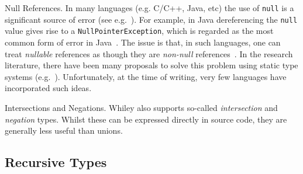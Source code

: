 \begin{insight}{Null References.}  In many languages (e.g. C/C++,
  Java, etc) the use of \lstinline{null} is a significant source of
  error (see e.g.~\cite{Hoa09}).  For example, in Java dereferencing
  the \lstinline{null} value gives rise to a
  \lstinline{NullPointerException}, which is regarded as the most
  common form of error in Java~\cite{XYZ}.  The issue is that, in such
  languages, one can treat {\em nullable} references as though they
  are {\em non-null} references~\cite{Pier02}.  In the research
  literature, there have been many proposals to solve this problem
  using static type systems
  (e.g.~\cite{PQVHV01,FL03,KH07,CFJJ06,CJ07,MPPD08,Hub08,HJP08}).
  Unfortunately, at the time of writing, very few languages have
  incorporated such ideas.
\end{insight}

\begin{insight}{Intersections and Negations.}
  Whiley also supports so-called {\em intersection} and {\em negation}
  types.  Whilst these can be expressed directly in source code, they
  are generally less useful than unions.
\end{insight}

\subsection{Recursive Types}

%
%
%
%

